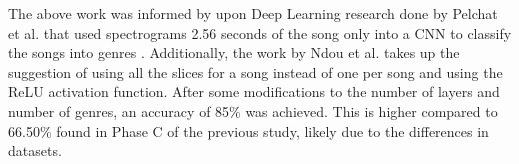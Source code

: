 The above work was informed by upon Deep Learning research done by Pelchat et al. that used spectrograms 2.56 seconds of the song only into a CNN to classify the songs into genres \cite{pelchat2020neural}. Additionally, the work by Ndou et al. takes up the suggestion of using all the slices for a song instead of one per song and using the ReLU activation function. After some modifications to the number of layers and number of genres, an accuracy of 85\% was achieved. This is higher compared to 66.50\% found in Phase C of the previous study, likely due to the differences in datasets.
